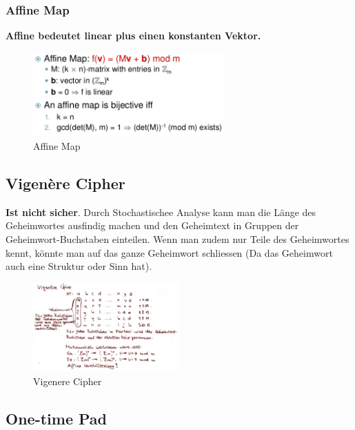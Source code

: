 \hypertarget{affine-map}{%
\subsubsection{Affine Map}\label{affine-map}}

\textbf{Affine bedeutet linear plus einen konstanten Vektor.}

\begin{figure}[H]
\centering
\includegraphics[width=0.65\textwidth]{figures/affineMap.png}
\caption{Affine Map}
\end{figure}

\hypertarget{vigenuxe8re-cipher}{%
\subsection{Vigenère Cipher}\label{vigenuxe8re-cipher}}

\textbf{Ist nicht sicher}. Durch Stochastischee Analyse kann man die Länge des
Geheimwortes ausfindig machen und den Geheimtext in Gruppen der
Geheimwort-Buchstaben einteilen. Wenn man zudem nur Teile des
Geheimwortes kennt, könnte man auf das ganze Geheimwort schliessen (Da
das Geheimwort auch eine Struktur oder Sinn hat).

\begin{figure}[H]
\centering
\includegraphics[width=0.5\textwidth]{figures/vigenereCipher.png}
\caption{Vigenere Cipher}
\end{figure}

\hypertarget{one-time-pad}{%
\subsection{One-time Pad}\label{one-time-pad}}

